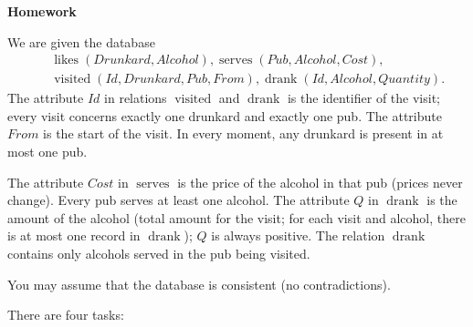 \documentclass[10pt, a4paper]{article}
\DeclareMathOperator{\likes}{likes}
\DeclareMathOperator{\serves}{serves}
\DeclareMathOperator{\visited}{visited}
\DeclareMathOperator{\drank}{drank}
\begin{document}
\addtolength{\parskip}{0.5\baselineskip}

\pagestyle{empty}


\centerline{\bf\large Homework}

\bigskip

\noindent We are given the database
\begin{eqnarray*}
& & \likes(Drunkard, Alcohol), \serves(Pub, Alcohol, Cost),\\
& & \visited(Id, Drunkard, Pub, From), \drank(Id, Alcohol, Quantity).
\end{eqnarray*}
The attribute $Id$ in relations $\visited$ and $\drank$ is the identifier of the visit; every visit concerns exactly one drunkard and exactly one pub. The attribute $From$ is the start of the visit. In every moment, any drunkard is present in at most one pub.

The attribute $Cost$ in $\serves$ is the price of the alcohol in that pub (prices never change). Every pub serves at least one alcohol.
The attribute $Q$ in $\drank$ is the amount of the alcohol (total amount for the visit; for each visit and alcohol, there is at most one record in $\drank$); $Q$ is always positive. The relation $\drank$ contains only alcohols served in the pub being visited.

You may assume that the database is consistent (no contradictions).

\noindent There are four tasks:
\end{document}
